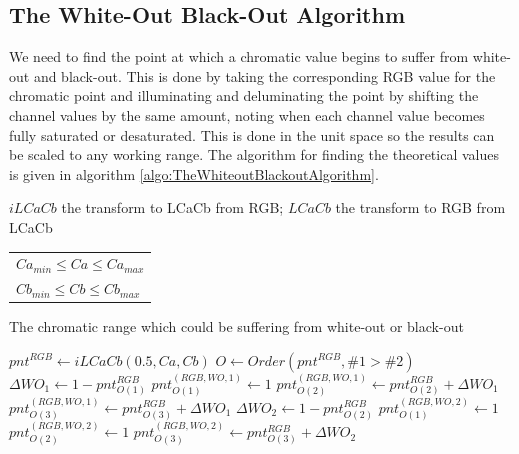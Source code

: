 \subsection{The White-Out Black-Out Algorithm}\label{sec:WhiteOutBlackOutAlgorithm}
We need to find the point at which a chromatic value begins to suffer from white-out and black-out. This is done by taking the corresponding RGB value for the chromatic point and illuminating and deluminating the point by shifting the channel values by the same amount, noting when each channel value becomes fully saturated or desaturated. This is done in the unit space so the results can be scaled to any working range. The algorithm for finding the theoretical values is given in algorithm \ref{algo:TheWhiteoutBlackoutAlgorithm}. 

\begin{algorithm}[H]
 \begin{algorithmic}
  \State \phantom{Require}  { $iLCaCb$ the transform to LCaCb from RGB; }
  \State \phantom{Require}  {  $LCaCb$ the transform to RGB from LCaCb}
 \State \phantom{Ensu} { \begin{tabular}{l}
 $Ca_{min}  \le Ca \le Ca_{max}$   \\ 
 $Cb_{min}  \le Cb \le Cb_{max}$  
 \end{tabular}  \parbox{0.65 \textwidth}{The chromatic range which could be suffering from white-out or black-out}}
 
   \State  $pnt^{RGB} \gets iLCaCb(0.5, Ca,Cb)$ 
   \State  $O \gets Order(pnt^{RGB}, \#1> \#2)$ 
   \State  $\Delta WO_1 \gets 1 - pnt^{RGB}_{O(1)} $ 
   \State  \phantom{Set} $pnt^{(RGB, WO, 1)}_{O(1)} \gets 1 $ 
   \State  \phantom{Set} $pnt^{(RGB, WO, 1)}_{O(2)} \gets  pnt^{RGB} _{O(2)} + \Delta WO_1 $ 
   \State  \phantom{Set} $pnt^{(RGB, WO, 1)}_{O(3)} \gets  pnt^{RGB} _{O(3)} + \Delta WO_1 $ 
   \State  $\Delta WO_2 \gets 1 - pnt^{RGB}_{O(2)} $
   \State  \phantom{Set}$pnt^{(RGB, WO, 2)}_{O(1)} \gets 1 $ 
   \State  \phantom{Set}$pnt^{(RGB, WO, 2)}_{O(2)} \gets 1 $ 
   \State  \phantom{Set}$pnt^{(RGB, WO, 2)}_{O(3)} \gets  pnt^{RGB} _{O(3)} + \Delta WO_2 $ 
     

\end{algorithmic}
\end{algorithm}
